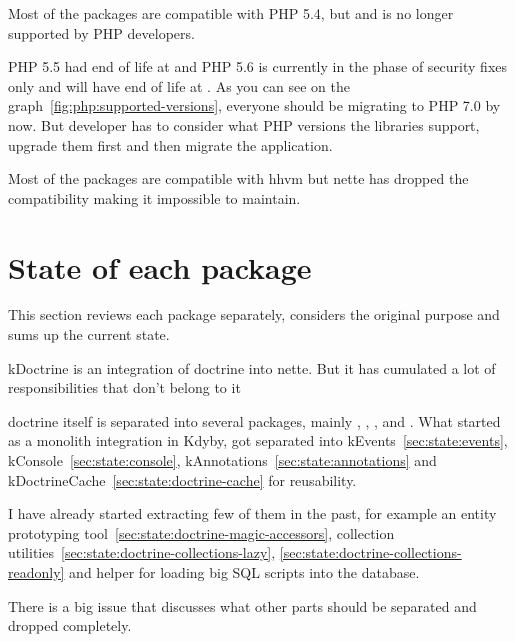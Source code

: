 Most of the packages are compatible with PHP 5.4, but  and is no longer supported by PHP developers.

PHP 5.5 had end of life at  and PHP 5.6 is currently in the phase of security fixes only and will have end of life at . As you can see on the graph~\ref{fig:php:supported-versions}, everyone should be migrating to PHP 7.0 by now. But developer has to consider what PHP versions the libraries support, upgrade them first and then migrate the application.

Most of the packages are compatible with \gls{hhvm} but \gls{nette} has dropped the compatibility making it impossible to maintain.

\section{State of each package}

This section reviews each package separately, considers the original purpose and sums up the current state.

 \label{sec:state:doctrine}

\gls{kDoctrine} is an integration of \gls{doctrine} into \gls{nette}. But it has cumulated a lot of responsibilities that don't belong to it

\gls{doctrine} itself is separated into several packages, mainly , , ,  and . What started as a monolith integration in Kdyby, got separated into \gls{kEvents}~\ref{sec:state:events}, \gls{kConsole}~\ref{sec:state:console}, \gls{kAnnotations}~\ref{sec:state:annotations} and \gls{kDoctrineCache}~\ref{sec:state:doctrine-cache} for reusability.

I have already started extracting few of them in the past, for example an entity prototyping tool~\ref{sec:state:doctrine-magic-accessors}, collection utilities~\ref{sec:state:doctrine-collections-lazy}, \ref{sec:state:doctrine-collections-readonly} and helper for loading big SQL scripts into the database.

There is a big issue  that discusses what other parts should be separated and dropped completely.

